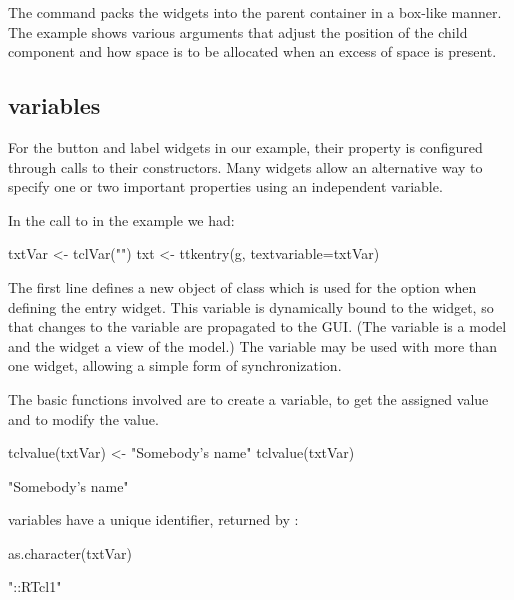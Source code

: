 The  command packs the widgets into the parent container
in a box-like manner. The example shows various arguments that adjust
the position of the child component and how space is to be allocated
when an excess of space is present.



\subsection{\TCL\/ variables}
\label{sec:tcltk:overview:textvariables}


For the button and label widgets in our example, their 
property is configured through calls to their constructors. Many
widgets allow an alternative way to specify one or two important
properties using an independent \Tcl\/ variable.

In the call to  in the example we had:

\begin{Schunk}
\begin{Sinput}
 txtVar <- tclVar("")
 txt <- ttkentry(g, textvariable=txtVar)
\end{Sinput}
\end{Schunk}
%
The first line defines a new object of class  which is
used for the  option when defining the entry
widget. This variable is dynamically bound to the widget, so that
changes to the variable are propagated to the GUI. (The \TCL\/
variable is a model and the widget a view of the model.)  The \Tcl{}
variable may be used with more than one widget, allowing a simple form
of synchronization.

The basic functions involved are  to create a \TCL\/
variable,  to get the assigned value and
 to modify the value.

\begin{Schunk}
\begin{Sinput}
 tclvalue(txtVar) <- "Somebody's name"
 tclvalue(txtVar)
\end{Sinput}
\begin{Soutput}
[1] "Somebody's name"
\end{Soutput}
\end{Schunk}

\TCL\/ variables have a unique identifier, returned by :
\begin{Schunk}
\begin{Sinput}
 as.character(txtVar)
\end{Sinput}
\begin{Soutput}
[1] "::RTcl1"
\end{Soutput}
\end{Schunk}

